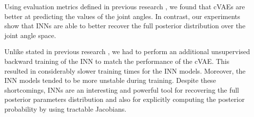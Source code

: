 \documentclass[conference]{IEEEtran}
\begin{document}
Using evaluation metrics defined in previous research \cite{Kruse2019}, we found that cVAEs are better at predicting the values of the joint angles. In contrast, our experiments show that INNs are able to better recover the full posterior distribution over the joint angle space. 

Unlike stated in previous research \cite{Ardizzone2018}, we had to perform an additional unsupervised backward training of the INN to match the performance of the cVAE. This resulted in considerably slower training times for the INN models. Moreover, the INN models tended to be more unstable during training. Despite these shortcomings, INNs are an interesting and powerful tool for recovering the full posterior parameters distribution and also for explicitly computing the posterior probability by using tractable Jacobians.

\nocite{*}


\end{document}
